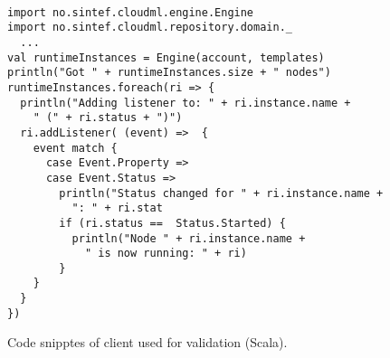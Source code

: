 \begin{figure}[tb]
  \begin{center}
    \begin{verbatim}

import no.sintef.cloudml.engine.Engine
import no.sintef.cloudml.repository.domain._
  ...
val runtimeInstances = Engine(account, templates)
println("Got " + runtimeInstances.size + " nodes")
runtimeInstances.foreach(ri => {
  println("Adding listener to: " + ri.instance.name + 
    " (" + ri.status + ")")
  ri.addListener( (event) =>  {
    event match {
      case Event.Property => 
      case Event.Status => 
        println("Status changed for " + ri.instance.name + 
          ": " + ri.stat
        if (ri.status ==  Status.Started) {
          println("Node " + ri.instance.name + 
            " is now running: " + ri)
        }
    }
  }
})
    \end{verbatim}
  \end{center}
  \caption{Code snipptes of client used for validation (Scala).}
  \label{list:validation-client}
\end{figure}


